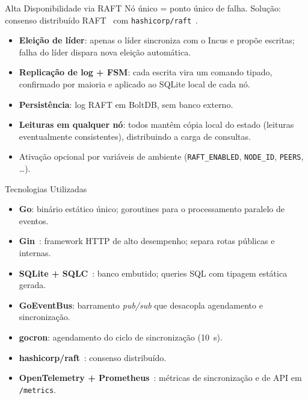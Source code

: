 \documentclass[aspectratio=169,xcolor=table]{beamer}
\begin{document}
\begin{frame}{Alta Disponibilidade via RAFT}
    Nó único = ponto único de falha. Solução: consenso distribuído
    RAFT~\cite{ongaro2014raft} com \texttt{hashicorp/raft}~\cite{hashicorp_raft}.
    \begin{itemize}
        \item \textbf{Eleição de líder}: apenas o líder sincroniza com o Incus e propõe
              escritas; falha do líder dispara nova eleição automática.
        \item \textbf{Replicação de log + FSM}: cada escrita vira um comando tipado,
              confirmado por maioria e aplicado ao SQLite local de cada nó.
        \item \textbf{Persistência}: log RAFT em BoltDB, sem banco externo.
        \item \textbf{Leituras em qualquer nó}: todos mantêm cópia local do estado
              (leituras eventualmente consistentes), distribuindo a carga de consultas.
        \item Ativação opcional por variáveis de ambiente
              (\texttt{RAFT\_ENABLED}, \texttt{NODE\_ID}, \texttt{PEERS}, \ldots).
    \end{itemize}
\end{frame}

\begin{frame}{Tecnologias Utilizadas}
    \begin{itemize}
        \item \textbf{Go}: binário estático único; goroutines para o processamento
              paralelo de eventos.
        \item \textbf{Gin}~\cite{gin2024}: framework HTTP de alto desempenho; separa
              rotas públicas e internas.
        \item \textbf{SQLite + SQLC}~\cite{sqlite2024}: banco embutido; queries SQL
              com tipagem estática gerada.
        \item \textbf{GoEventBus}: barramento \textit{pub/sub} que desacopla
              agendamento e sincronização.
        \item \textbf{gocron}: agendamento do ciclo de sincronização (10~s).
        \item \textbf{hashicorp/raft}~\cite{hashicorp_raft}: consenso distribuído.
        \item \textbf{OpenTelemetry + Prometheus}~\cite{opentelemetry2024,prometheus2024}:
              métricas de sincronização e de API em \texttt{/metrics}.
    \end{itemize}
\end{frame}
\end{document}
